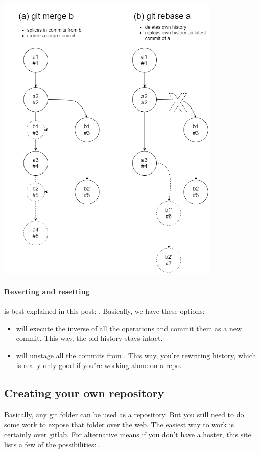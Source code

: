 \includegraphics[width=0.8\textwidth]{images/merge_vs_rebase.png}

\paragraph{Reverting and resetting} is best explained in this post: . Basically, we have these options: 

\begin{itemize}
    \item {} will execute the inverse of all the operations and commit them as a new commit. This way, the old history stays intact.
    \item {} will unstage all the commits from . This way, you're rewriting history, which is really only good if you're working alone on a repo.
\end{itemize}


\subsection{Creating your own repository}
Basically, any git folder can be used as a repository. But you still need to do some work to expose that folder over the web. The easiest way to work is certainly over gitlab. For alternative means if you don't have a hoster, this site lists a few of the possibilities: .
